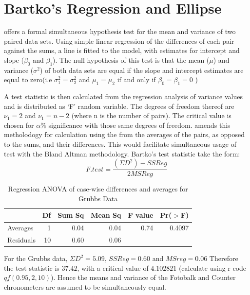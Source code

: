 \documentclass[12pt, a4paper]{article}
\begin{document}
\section{Bartko's Regression and Ellipse}
\citet{BB89} offers a formal simultaneous hypothesis test for the
mean and variance of two paired data sets. Using simple linear
regression of the differences of each pair against the sums, a
line is fitted to the model, with estimates for intercept and
slope ($\beta_{0}$ and $\beta_{1}$). The null hypothesis of this
test is that the mean ($\mu$) and variance ($\sigma^{2}$) of both
data sets are equal if the slope and intercept estimates are equal
to zero(i.e $\sigma^{2}_{1} = \sigma^{2}_{2}$ and
$\mu_{1}=\mu_{2}$ if and only if $\beta_{0}= \beta_{1}=0$ )

A test statistic is then calculated from the regression analysis
of variance values \citep{BB89} and is distributed as `F' random
variable. The degrees of freedom thereof are $\nu_{1}=2$ and
$\nu_{1}=n-2$ (where n is the number of pairs). The critical value
is chosen for $\alpha\%$ significance with those same degrees of
freedom. \citet{Bartko} amends this metholodogy for calculation
using the from the averages of the pairs, as opposed to the sums,
and their differences. This would facilitate simultaneous usage of
test with the Bland Altman methodology. Bartko's test statistic
take the form:
\begin{equation} F.test = \frac{(\Sigma D^{2})-SSReg}{2MSReg}
\end{equation}

\newpage

\begin{table}[ht]
\begin{center}
\begin{tabular}{lrrrrr}
  \hline
 & Df & Sum Sq & Mean Sq & F value & Pr($>$F) \\
  \hline
Averages & 1 & 0.04 & 0.04 & 0.74 & 0.4097 \\
  Residuals & 10 & 0.60 & 0.06 &  &  \\
   \hline
\end{tabular}
\caption{Regression ANOVA of case-wise differences and averages
for Grubbs Data}
\end{center}
\end{table}




For the Grubbs data, $\Sigma D^{2}=5.09 $, $SSReg = 0.60$ and
$MSreg=0.06$ Therefore the test statistic is $37.42$, with a
critical value of $4.102821$ (calculate using r code
$qf(0.95,2,10)$). Hence the means and variance of the Fotobalk and
Counter chronometers are assumed to be simultaneously equal.
\end{document}
